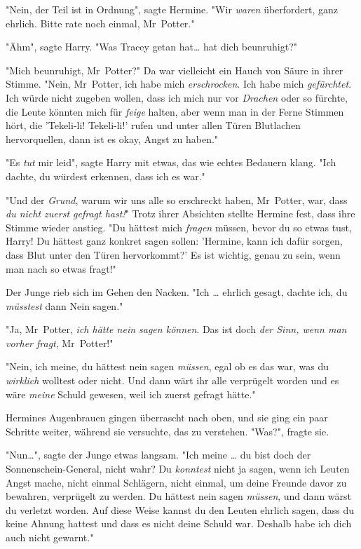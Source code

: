 {"Nein, der Teil ist in Ordnung", sagte Hermine. "Wir \emph{waren} überfordert, ganz ehrlich. Bitte rate noch einmal, Mr~Potter."

"Ähm", sagte Harry. "Was Tracey getan hat… hat dich beunruhigt?"

"Mich beunruhigt, Mr~Potter?" Da war vielleicht ein Hauch von Säure in ihrer Stimme. "Nein, Mr~Potter, ich habe mich \emph{erschrocken}. Ich habe mich \emph{gefürchtet}. Ich würde nicht zugeben wollen, dass ich mich nur vor \emph{Drachen} oder so fürchte, die Leute könnten mich für \emph{feige} halten, aber wenn man in der Ferne Stimmen hört, die 'Tekeli-li! Tekeli-li!' rufen und unter allen Türen Blutlachen hervorquellen, dann ist es okay, Angst zu haben."

"Es \emph{tut} mir leid", sagte Harry mit etwas, das wie echtes Bedauern klang. "Ich dachte, du würdest erkennen, dass ich es war."

"Und der \emph{Grund}, warum wir uns alle so erschreckt haben, Mr~Potter, war, dass \emph{du nicht zuerst gefragt hast!}" Trotz ihrer Absichten stellte Hermine fest, dass ihre Stimme wieder anstieg. "Du hättest mich \emph{fragen} müssen, bevor du so etwas tust, Harry! Du hättest ganz konkret sagen sollen: 'Hermine, kann ich dafür sorgen, dass Blut unter den Türen hervorkommt?' Es ist wichtig, genau zu sein, wenn man nach so etwas fragt!"

Der Junge rieb sich im Gehen den Nacken. "Ich … ehrlich gesagt, dachte ich, du \emph{müsstest} dann Nein sagen."

"Ja, Mr~Potter, \emph{ich hätte nein sagen können}. Das ist doch \emph{der Sinn, wenn man vorher fragt}, Mr~Potter!"

"Nein, ich meine, du hättest nein sagen \emph{müssen}, egal ob es das war, was du \emph{wirklich} wolltest oder nicht. Und dann wärt ihr alle verprügelt worden und es wäre \emph{meine} Schuld gewesen, weil ich zuerst gefragt hätte."

Hermines Augenbrauen gingen überrascht nach oben, und sie ging ein paar Schritte weiter, während sie versuchte, das zu verstehen. "Was?", fragte sie.

"Nun…", sagte der Junge etwas langsam. "Ich meine … du bist doch der Sonnenschein-General, nicht wahr? Du \emph{konntest} nicht ja sagen, wenn ich Leuten Angst mache, nicht einmal Schlägern, nicht einmal, um deine Freunde davor zu bewahren, verprügelt zu werden. Du hättest nein sagen \emph{müssen}, und dann wärst du verletzt worden. Auf diese Weise kannst du den Leuten ehrlich sagen, dass du keine Ahnung hattest und dass es nicht deine Schuld war. Deshalb habe ich dich auch nicht gewarnt."

}
